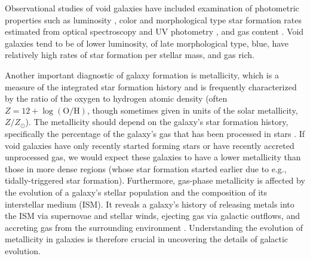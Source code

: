 
Observational studies of void galaxies have included examination of photometric 
properties such as luminosity \citep{Hoyle05, Croton05, Moorman15}, color and 
morphological type \citep{Grogin00, Rojas04, Patiri06, Park07, 
vonBendaBeckmann08, Hoyle12} star formation rates estimated from optical 
spectroscopy and UV photometry \citep{Rojas05, Moorman15, Beygu16}, and gas 
content \citep{Kreckel12, Moorman16, Jones16}.  Void galaxies tend to be of 
lower luminosity, of late morphological type, blue, have relatively high rates 
of star formation per stellar mass, and gas rich.


Another important diagnostic of galaxy formation is metallicity, which is a 
measure of the integrated star formation history and is frequently characterized 
by the ratio of the oxygen to hydrogen atomic density (often 
$Z = 12 + \log (\text{O}/\text{H})$, though sometimes given in units of the 
solar metallicity, $Z/Z_{\odot}$).  The metallicity should depend on the 
galaxy's star formation history, specifically the percentage of the galaxy's gas 
that has been processed in stars \citep{Guseva09}.  If void galaxies have only 
recently started forming stars or have recently accreted unprocessed gas, we 
would expect these galaxies to have a lower metallicity than those in more dense 
regions (whose star formation started earlier due to e.g., tidally-triggered 
star formation).  Furthermore, gas-phase metallicity is affected by the 
evolution of a galaxy's stellar population and the composition of its 
interstellar medium (ISM).  It reveals a galaxy's history of releasing metals 
into the ISM via supernovae and stellar winds, ejecting gas via galactic 
outflows, and accreting gas from the surrounding environment 
\citep[see, e.g.,][and references therein]{Cooper08,Cybulski14,Hirschmann14}.  
Understanding the evolution of metallicity in galaxies is therefore crucial in 
uncovering the details of galactic evolution.


